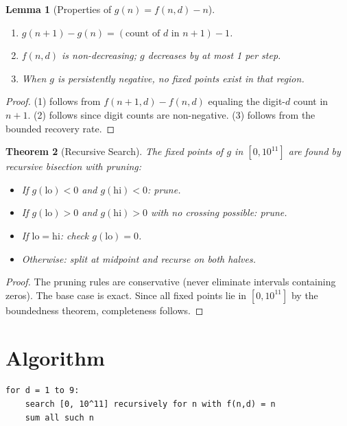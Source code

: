 \documentclass[12pt]{article}
\newtheorem{theorem}{Theorem}
\newtheorem{lemma}[theorem]{Lemma}
\begin{document}
\begin{lemma}[Properties of $g(n) = f(n,d) - n$]
\leavevmode
\begin{enumerate}
    \item $g(n+1) - g(n) = (\text{count of } d \text{ in } n+1) - 1$.
    \item $f(n,d)$ is non-decreasing; $g$ decreases by at most 1 per step.
    \item When $g$ is persistently negative, no fixed points exist in that region.
\end{enumerate}
\end{lemma}

\begin{proof}
(1) follows from $f(n+1,d) - f(n,d)$ equaling the digit-$d$ count in $n+1$. (2) follows since digit counts are non-negative. (3) follows from the bounded recovery rate.
\end{proof}

\begin{theorem}[Recursive Search]
The fixed points of $g$ in $[0, 10^{11}]$ are found by recursive bisection with pruning:
\begin{itemize}
    \item If $g(\mathrm{lo}) < 0$ and $g(\mathrm{hi}) < 0$: prune.
    \item If $g(\mathrm{lo}) > 0$ and $g(\mathrm{hi}) > 0$ with no crossing possible: prune.
    \item If $\mathrm{lo} = \mathrm{hi}$: check $g(\mathrm{lo}) = 0$.
    \item Otherwise: split at midpoint and recurse on both halves.
\end{itemize}
\end{theorem}

\begin{proof}
The pruning rules are conservative (never eliminate intervals containing zeros). The base case is exact. Since all fixed points lie in $[0, 10^{11}]$ by the boundedness theorem, completeness follows.
\end{proof}

\section{Algorithm}

\begin{verbatim}
for d = 1 to 9:
    search [0, 10^11] recursively for n with f(n,d) = n
    sum all such n
\end{verbatim}
\end{document}
